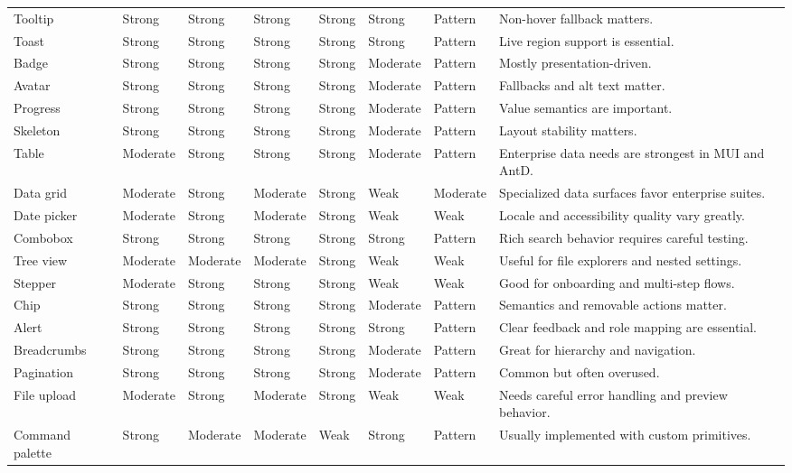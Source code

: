 \begin{longtable}{@{}p{}p{}p{}p{}p{}p{}p{}p{}@{}}
Tooltip & Strong & Strong & Strong & Strong & Strong & Pattern & Non-hover fallback matters. \\
Toast & Strong & Strong & Strong & Strong & Strong & Pattern & Live region support is essential. \\
Badge & Strong & Strong & Strong & Strong & Moderate & Pattern & Mostly presentation-driven. \\
Avatar & Strong & Strong & Strong & Strong & Moderate & Pattern & Fallbacks and alt text matter. \\
Progress & Strong & Strong & Strong & Strong & Moderate & Pattern & Value semantics are important. \\
Skeleton & Strong & Strong & Strong & Strong & Moderate & Pattern & Layout stability matters. \\
Table & Moderate & Strong & Strong & Strong & Moderate & Pattern & Enterprise data needs are strongest in MUI and AntD. \\
Data grid & Moderate & Strong & Moderate & Strong & Weak & Moderate & Specialized data surfaces favor enterprise suites. \\
Date picker & Moderate & Strong & Moderate & Strong & Weak & Weak & Locale and accessibility quality vary greatly. \\
Combobox & Strong & Strong & Strong & Strong & Strong & Pattern & Rich search behavior requires careful testing. \\
Tree view & Moderate & Moderate & Moderate & Strong & Weak & Weak & Useful for file explorers and nested settings. \\
Stepper & Moderate & Strong & Strong & Strong & Weak & Weak & Good for onboarding and multi-step flows. \\
Chip & Strong & Strong & Strong & Strong & Moderate & Pattern & Semantics and removable actions matter. \\
Alert & Strong & Strong & Strong & Strong & Strong & Pattern & Clear feedback and role mapping are essential. \\
Breadcrumbs & Strong & Strong & Strong & Strong & Moderate & Pattern & Great for hierarchy and navigation. \\
Pagination & Strong & Strong & Strong & Strong & Moderate & Pattern & Common but often overused. \\
File upload & Moderate & Strong & Moderate & Strong & Weak & Weak & Needs careful error handling and preview behavior. \\
Command palette & Strong & Moderate & Moderate & Weak & Strong & Pattern & Usually implemented with custom primitives. \\
\end{longtable}

